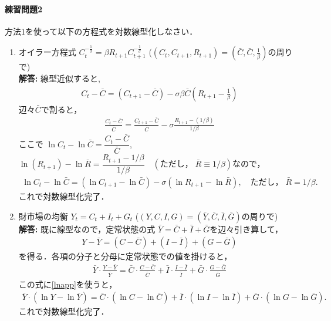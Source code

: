 \documentclass[a4paper,12pt,onecolumn,oneside,notitlepage,final]{article}
\begin{document}
\paragraph{練習問題2} 方法1を使って以下の方程式を対数線型化しなさい．
\begin{enumerate}
\item オイラー方程式 $C_t^{-\frac{1}{\sigma}} = \beta R_{t+1} C_{t+1}^{-\frac{1}{\sigma}}$ ($(C_t, C_{t+1}, R_{t+1}) = (\bar C, \bar C, \frac{1}{\beta})$の周りで)\\

{\bf 解答:} 線型近似すると,
\begin{align*}
C_t - \bar C = (C_{t+1}-\bar C) - \sigma \beta \bar C (R_{t+1} - \frac{1}{\beta})
\end{align*}
辺々$\bar C$で割ると，
\begin{align*}
\frac{C_t - \bar C}{\bar C} = \frac{C_{t+1}-\bar C}{\bar C} - \sigma \frac{R_{t+1}-(1/\beta)}{1/\beta}
\end{align*}
ここで $\ln C_t - \ln \bar C = \dfrac{C_t - \bar C}{\bar C}$, $\ln (R_{t+1}) - \ln \bar R = \dfrac{R_{t+1} - 1/\beta}{1/\beta} \quad (\text{ただし，}\; \bar R \equiv 1/\beta)$なので，
\begin{align*}
\ln C_t - \ln \bar C = (\ln C_{t+1} - \ln \bar C) - \sigma (\ln R_{t+1} - \ln \bar R), \quad \text{ただし，} \; \bar R = 1/\beta.
\end{align*}
これで対数線型化完了．\\


\item 財市場の均衡 $Y_t = C_t + I_t + G_t$ ($(Y,C,I,G) = (\bar Y, \bar C, \bar I, \bar G)$の周りで)\\

{\bf 解答:} 既に線型なので，定常状態の式 $\bar Y = \bar C + \bar I + \bar G$を辺々引き算して，
\begin{align*}
Y - \bar Y = (C - \bar C) + (I - \bar I) + (G - \bar G)
\end{align*}
を得る．各項の分子と分母に定常状態での値を掛けると，
\begin{align*}
\bar Y \cdot \frac{Y - \bar Y}{\bar Y} = \bar C\cdot \frac{C - \bar C}{\bar C} + \bar I \cdot \frac{I - \bar I}{\bar I} + \bar G\cdot \frac{G - \bar G}{\bar G}
\end{align*}
この式に\eqref{lnapp}を使うと，
\begin{align*}
\bar Y \cdot (\ln Y - \ln \bar Y) = \bar C\cdot (\ln C - \ln \bar C) + \bar I \cdot (\ln I - \ln \bar I) + \bar G\cdot (\ln G - \ln \bar G).
\end{align*}
これで対数線型化完了．
\end{enumerate}
\end{document}
